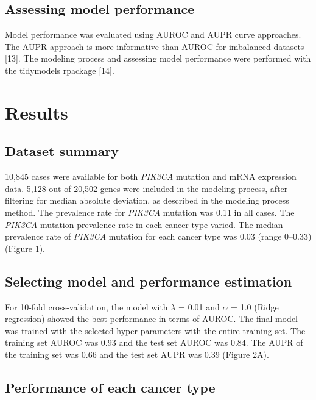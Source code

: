 \documentclass[10pt,letterpaper]{article}
\begin{document}
\hypertarget{assessing-model-performance}{%
\subsection{Assessing model
performance}\label{assessing-model-performance}}

Model performance was evaluated using AUROC and AUPR curve approaches.
The AUPR approach is more informative than AUROC for imbalanced datasets
{[}13{]}. The modeling process and assessing model performance were
performed with the tidymodels rpackage {[}14{]}.

\hypertarget{results}{%
\section{Results}\label{results}}

\hypertarget{dataset-summary}{%
\subsection{Dataset summary}\label{dataset-summary}}

10,845 cases were available for both \emph{PIK3CA} mutation and mRNA
expression data. 5,128 out of 20,502 genes were included in the modeling
process, after filtering for median absolute deviation, as described in
the modeling process method. The prevalence rate for \emph{PIK3CA}
mutation was 0.11 in all cases. The \emph{PIK3CA} mutation prevalence
rate in each cancer type varied. The median prevalence rate of
\emph{PIK3CA} mutation for each cancer type was 0.03 (range 0--0.33)
(Figure 1).

\hypertarget{selecting-model-and-performance-estimation}{%
\subsection{Selecting model and performance
estimation}\label{selecting-model-and-performance-estimation}}

For 10-fold cross-validation, the model with \(\lambda\) = 0.01 and
\(\alpha\) = 1.0 (Ridge regression) showed the best performance in terms
of AUROC. The final model was trained with the selected hyper-parameters
with the entire training set. The training set AUROC was 0.93 and the
test set AUROC was 0.84. The AUPR of the training set was 0.66 and the
test set AUPR was 0.39 (Figure 2A).

\hypertarget{performance-of-each-cancer-type}{%
\subsection{Performance of each cancer
type}\label{performance-of-each-cancer-type}}
\end{document}

